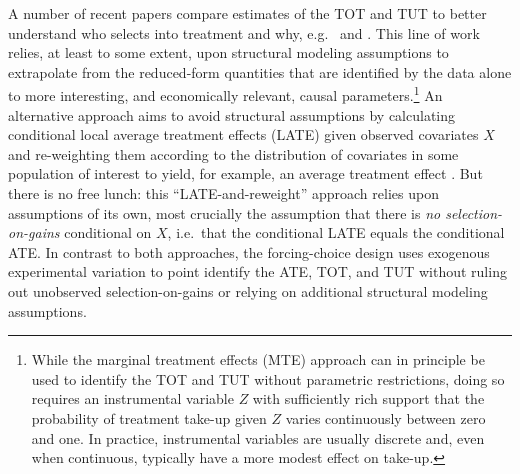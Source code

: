 \documentclass[12pt, a4paper]{article}
\begin{document}
A number of recent papers compare estimates of the TOT and TUT to better understand who selects into treatment and why, e.g.\ \cite{cornelissen2018benefits} and \cite{Walters}. 
This line of work relies, at least to some extent, upon structural modeling assumptions to extrapolate from the reduced-form quantities that are identified by the data alone to more interesting, and economically relevant, causal parameters.\footnote{While the marginal treatment effects (MTE) approach \citep{heckman2007econometric} can in principle be used to identify the TOT and TUT without parametric restrictions, doing so requires an instrumental variable $Z$ with sufficiently rich support that the probability of treatment take-up given $Z$ varies continuously between zero and one. In practice, instrumental variables are usually discrete and, even when continuous, typically have a more modest effect on take-up.} 
An alternative approach aims to avoid structural assumptions by calculating conditional local average treatment effects (LATE) given observed covariates $X$ and re-weighting them according to the distribution of covariates in some population of interest to yield, for example, an average treatment effect \citep{aronow2013beyond,angrist2013extrapolate}. 
But there is no free lunch: this ``LATE-and-reweight'' approach relies upon assumptions of its own, most crucially the assumption that there is \emph{no selection-on-gains} conditional on $X$, i.e.\ that the conditional LATE equals the conditional ATE. 
In contrast to both approaches, the forcing-choice design uses exogenous experimental variation to point identify the ATE, TOT, and TUT without ruling out unobserved selection-on-gains or relying on additional structural modeling assumptions.
\end{document}
